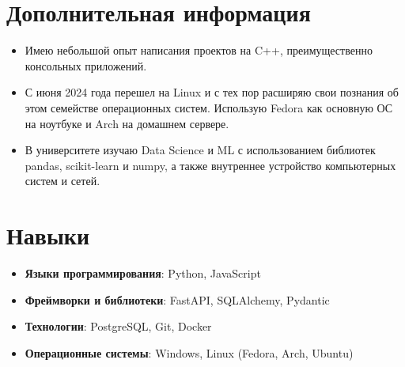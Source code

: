 \documentclass[letterpaper,10pt]{article}
\newcommand{\resumeSubHeadingListStart}{\begin{itemize}[leftmargin=*]}
\newcommand{\resumeSubHeadingListEnd}{\end{itemize}}
\begin{document}
\section{Дополнительная информация}
 \resumeSubHeadingListStart
   \item{
     { Имею небольшой опыт написания проектов на C++, преимущественно консольных приложений. }
   }\vspace{-7pt}
   \item{
     { С июня 2024 года перешел на Linux и с тех пор расширяю свои познания об этом семействе операционных систем. Использую Fedora как основную ОС на ноутбуке и Arch на домашнем сервере. }
   }\vspace{-7pt}
   \item{
     { В университете изучаю Data Science и ML с использованием библиотек pandas, scikit-learn и numpy, а также внутреннее устройство компьютерных систем и сетей. }
   }
 \resumeSubHeadingListEnd


\section{Навыки}
 \resumeSubHeadingListStart
   \item{
     \textbf{Языки программирования}{: Python, JavaScript }
   }\vspace{-7pt}
   \item{
     \textbf{Фреймворки и библиотеки}{: FastAPI, SQLAlchemy, Pydantic }
   }
   \vspace{-7pt}
   \item{
     \textbf{Технологии}{: PostgreSQL, Git, Docker  }
   }
   \vspace{-7pt}
   \item{
     \textbf{Операционные системы}{: Windows, Linux (Fedora, Arch, Ubuntu) }
   }
 \resumeSubHeadingListEnd
\end{document}
